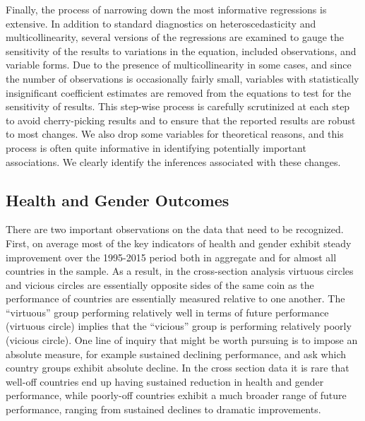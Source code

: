 \documentclass[12pt]{article}
\begin{document}
Finally, the process of narrowing down the most informative regressions is extensive. In addition to standard diagnostics on heteroscedasticity and multicollinearity, several versions of the regressions are examined to gauge the sensitivity of the results to variations in the equation, included observations, and variable forms. Due to the presence of multicollinearity in some cases, and since the number of observations is occasionally fairly small, variables with statistically insignificant coefficient estimates are removed from the equations to test for the sensitivity of results. This step-wise process is carefully scrutinized at each step to avoid cherry-picking results and to ensure that the reported results are robust to most changes. We also drop some variables for theoretical reasons, and this process is often quite informative in identifying potentially important associations. We clearly identify the inferences associated with these changes.

\subsection{Health and Gender Outcomes}

There are two important observations on the data that need to be recognized. First, on average most of the key indicators of health and gender exhibit steady improvement over the 1995-2015 period both in aggregate and for almost all countries in the sample. As a result, in the cross-section analysis virtuous circles and vicious circles are essentially opposite sides of the same coin as the performance of countries are essentially measured relative to one another. The \enquote{virtuous} group performing relatively well in terms of future performance (virtuous circle) implies that the \enquote{vicious} group is performing relatively poorly (vicious circle). One line of inquiry that might be worth pursuing is to impose an absolute measure, for example sustained declining performance, and ask which country groups exhibit absolute decline. In the cross section data it is rare that well-off countries end up having sustained reduction in health and gender performance, while poorly-off countries exhibit a much broader range of future performance, ranging from sustained declines to dramatic improvements.
\end{document}

